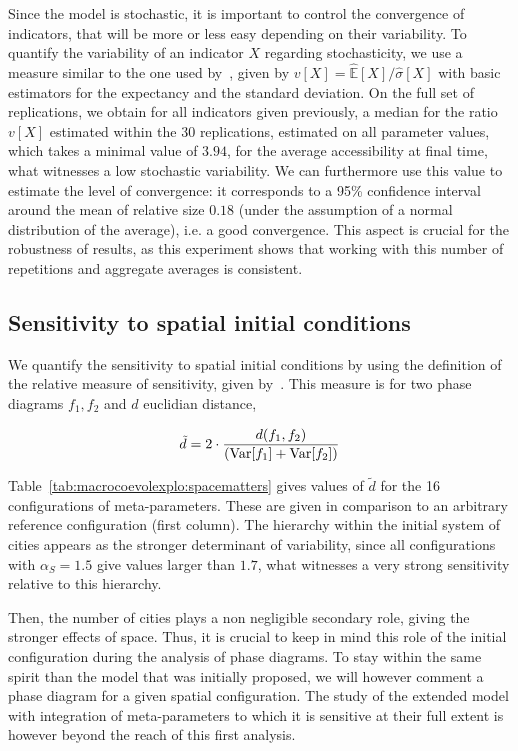 Since the model is stochastic, it is important to control the convergence of indicators, that will be more or less easy depending on their variability. To quantify the variability of an indicator $X$ regarding stochasticity, we use a measure similar to the one used by~\cite{raimbault2018calibration}, given by $v\left[X\right] = \hat{\mathbb{E}}\left[X\right]/\hat{\sigma}\left[X\right]$ with basic estimators for the expectancy and the standard deviation. On the full set of replications, we obtain for all indicators given previously, a median for the ratio $v\left[X\right]$ estimated within the 30 replications, estimated on all parameter values, which takes a minimal value of $3.94$, for the average accessibility at final time, what witnesses a low stochastic variability. We can furthermore use this value to estimate the level of convergence: it corresponds to a 95\% confidence interval around the mean of relative size $0.18$ (under the assumption of a normal distribution of the average), i.e. a good convergence. This aspect is crucial for the robustness of results, as this experiment shows that working with this number of repetitions and aggregate averages is consistent.


\subsection{Sensitivity to spatial initial conditions}

We quantify the sensitivity to spatial initial conditions by using the definition of the relative measure of sensitivity, given by~\cite{cottineau2017initial}. This measure is for two phase diagrams $f_1,f_2$ and $d$ euclidian distance, 

\begin{equation}
\tilde{d} = 2 \cdot \frac{d(f_1,f_2)}{(\operatorname{Var}\!\left[f_1\right]+\operatorname{Var}\!\left[f_2\right])}
\end{equation}

Table~\ref{tab:macrocoevolexplo:spacematters} gives values of $\tilde{d}$ for the 16 configurations of meta-parameters. These are given in comparison to an arbitrary reference configuration (first column). The hierarchy within the initial system of cities appears as the stronger determinant of variability, since all configurations with $\alpha_S = 1.5$ give values larger than $1.7$, what witnesses a very strong sensitivity relative to this hierarchy.

Then, the number of cities plays a non negligible secondary role, giving the stronger effects of space. Thus, it is crucial to keep in mind this role of the initial configuration during the analysis of phase diagrams. To stay within the same spirit than the model that was initially proposed, we will however comment a phase diagram for a given spatial configuration. The study of the extended model with integration of meta-parameters to which it is sensitive at their full extent is however beyond the reach of this first analysis.




